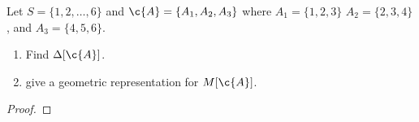 \prob
{
    Let $S = \{1, 2, \dots, 6\}$ and $\c{A} = \{A_1, A_2, A_3\}$ where $A_1 = \{1, 2, 3\}$
    $A_2 = \{2, 3, 4\}$, and $A_3 = \{4, 5, 6\}$.
    \begin{enumerate}[label=(\roman*)]
        \item   Find $\Delta[\c{A}]$.
        \item   give a geometric representation for $M[\c{A}]$.
    \end{enumerate}
}
\begin{proof}
\end{proof}